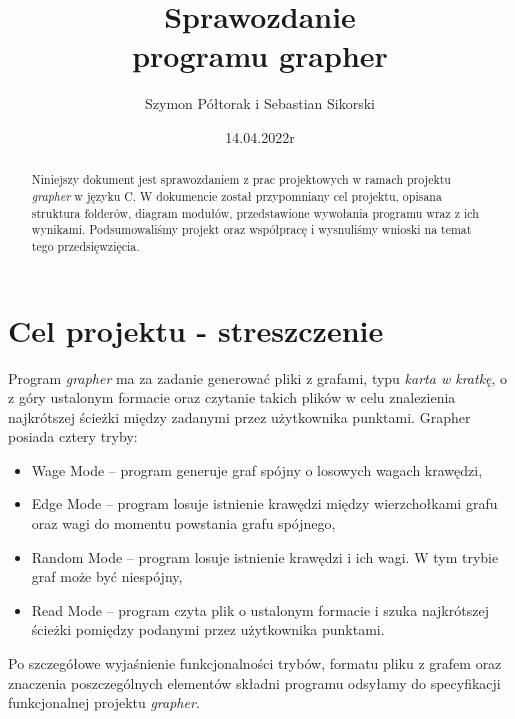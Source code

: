 \documentclass[10pt, a4paper]{report}
\title{\huge{\textbf{Sprawozdanie} \\ programu grapher}}
\author{Szymon Półtorak i Sebastian Sikorski}
\date{14.04.2022r}
\begin{document}
    \maketitle

    \renewcommand*\thesection{\arabic{section}}
    
    \begin{abstract}
        Niniejszy dokument jest sprawozdaniem z prac projektowych w ramach projektu \textit{grapher} w języku C.
        W dokumencie został przypomniany cel projektu, opisana struktura folderów, diagram modułów, przedstawione
        wywołania programu wraz z ich wynikami. Podsumowaliśmy projekt oraz współpracę i wysnuliśmy wnioski na temat tego przedsięwzięcia.
    \end{abstract}

    \pagestyle{fancy}
    \fancyhf{}
    
    \tableofcontents
    \newpage

    \section{Cel projektu - streszczenie}
    Program \textit{grapher} ma za zadanie generować pliki z grafami, typu \textit{karta w kratkę}, o z góry ustalonym formacie oraz czytanie takich plików w celu znalezienia najkrótszej ścieżki między zadanymi
    przez użytkownika punktami. Grapher posiada cztery tryby:
    \begin{itemize}
        \item Wage Mode – program generuje graf spójny o losowych wagach krawędzi,
        \item Edge Mode – program losuje istnienie krawędzi między wierzchołkami grafu oraz wagi do
        momentu powstania grafu spójnego,
        \item Random Mode – program losuje istnienie krawędzi i ich wagi. W tym trybie graf może być niespójny,
        \item Read Mode – program czyta plik o ustalonym formacie i szuka najkrótszej ścieżki pomiędzy podanymi przez użytkownika punktami.        
    \end{itemize}
    Po szczegółowe wyjaśnienie funkcjonalności trybów, formatu pliku z grafem oraz znaczenia poszczególnych elementów składni programu odsyłamy do specyfikacji funkcjonalnej projektu \textit{grapher}.
\end{document}
